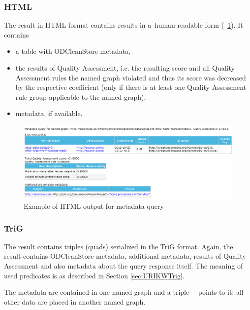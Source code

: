 \subsubsection{HTML}

The result in HTML format contains results in a~human-readable form (\figurename~\ref{fig:metadataQuery}). It contains

\begin{itemize}
  \item a table with ODCleanStore metadata,
  \item the results of Quality Assessment, i.e. the resulting score and all Quality Assessment rules the named graph violated and thus its score was decreased by the respective coefficient (only if there is at least one Quality Assessment rule group applicable to the named graph),
  \item {} metadata, if available.
\end{itemize}

\begin{figure}[htb]
    \centering
    \includegraphics[width=\textwidth]{images/metadata-query-screenshot.png}
    \caption{Example of HTML output for metadata query}
	\label{fig:metadataQuery}
\end{figure}

\subsubsection{TriG}
\label{sec:metadataTriG}
The result contains triples (quads) serialized in the TriG format. Again, the result contains ODCleanStore metadata, additional  metadata, results of Quality Assessment and also metadata about the query response itself. The meaning of used predicates is as described in Section \ref{sec:URIKWTrig}.

The  metadata are contained in one named graph and a triple -- points to it; all other data are placed in another named graph.

